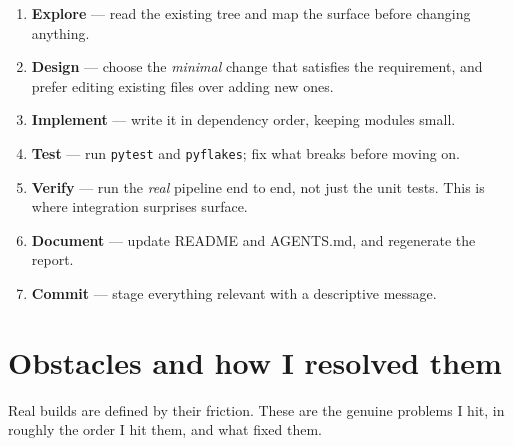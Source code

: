 \documentclass[11pt,a4paper]{article}
\newcommand{\code}[1]{\texttt{\small #1}}
\begin{document}
\begin{enumerate}[leftmargin=1.4em,itemsep=3pt]
  \item \textbf{Explore} --- read the existing tree and map the surface before
    changing anything.
  \item \textbf{Design} --- choose the \emph{minimal} change that satisfies the
    requirement, and prefer editing existing files over adding new ones.
  \item \textbf{Implement} --- write it in dependency order, keeping modules
    small.
  \item \textbf{Test} --- run \code{pytest} and \code{pyflakes}; fix what breaks
    before moving on.
  \item \textbf{Verify} --- run the \emph{real} pipeline end to end, not just the
    unit tests. This is where integration surprises surface.
  \item \textbf{Document} --- update README and AGENTS.md, and regenerate the
    report.
  \item \textbf{Commit} --- stage everything relevant with a descriptive
    message.
\end{enumerate}

\section{Obstacles and how I resolved them}

Real builds are defined by their friction. These are the genuine problems I hit,
in roughly the order I hit them, and what fixed them.
\end{document}
